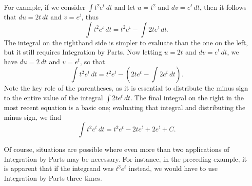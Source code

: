 For example, if we consider $\int t^2 e^t \, dt$ and let $u = t^2$ and $dv = e^t \, dt$, then it follows that  $du = 2t \, dt$ and $v = e^t$, thus
$$\int t^2 e^t \, dt = t^2 e^t - \int 2t e^t \, dt.$$
The integral on the righthand side is simpler to evaluate than the one on the left, but it still requires Integration by Parts.  Now letting $u = 2t$ and $dv = e^t \, dt$, we have $du = 2\, dt$ and $v = e^t$, so that 
$$\int t^2 e^t \, dt = t^2 e^t - \left( 2t e^t - \int 2 e^t \, dt \right).$$
Note the key role of the parentheses, as it is essential to distribute the minus sign to the entire value of the integral $\int 2t e^t \, dt$.  The final integral on the right in the most recent equation is a basic one; evaluating that integral and distributing the minus sign, we find
$$\int t^2 e^t \, dt = t^2 e^t - 2t e^t +  2 e^t + C.$$

Of course, situations are possible where even more than two applications of Integration by Parts may be necessary.  For instance, in the preceding example, it is apparent that if the integrand was $t^3e^t$ instead, we would have to use Integration by Parts three times.

